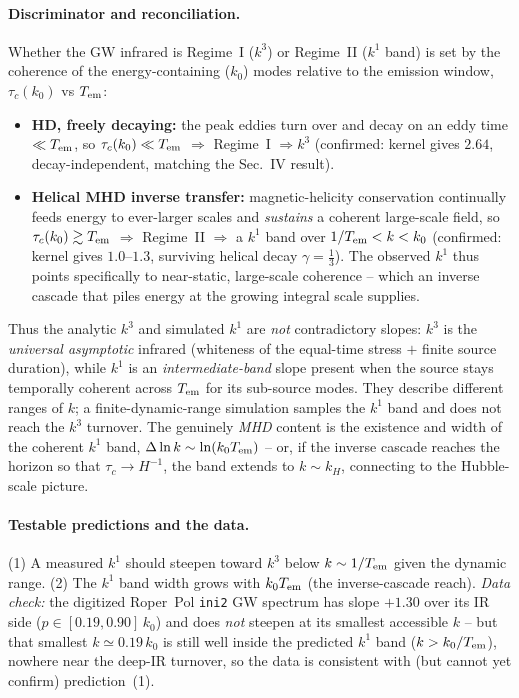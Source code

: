 \paragraph{Discriminator and reconciliation.}
Whether the GW infrared is Regime~I ($k^3$) or Regime~II ($k^1$ band) is set by the coherence of
the energy-containing ($k_0$) modes relative to the emission window, $\tau_c(k_0)$ vs $T_{\rm em}$:
\begin{itemize}\itemsep2pt
\item \textbf{HD, freely decaying:} the peak eddies turn over and decay on an eddy time
  $\ll T_{\rm em}$, so $\tau_c(k_0)\ll T_{\rm em}$ $\Rightarrow$ Regime~I $\Rightarrow k^3$
  (confirmed: kernel gives $2.64$, decay-independent, matching the Sec.~IV result).
\item \textbf{Helical MHD inverse transfer:} magnetic-helicity conservation continually feeds
  energy to ever-larger scales and \emph{sustains} a coherent large-scale field, so
  $\tau_c(k_0)\gtrsim T_{\rm em}$ $\Rightarrow$ Regime~II $\Rightarrow$ a $k^1$ band over
  $1/T_{\rm em}<k<k_0$ (confirmed: kernel gives $1.0$--$1.3$, surviving helical decay
  $\gamma=\tfrac13$). The observed $k^1$ thus points specifically to near-static, large-scale
  coherence -- which an inverse cascade that piles energy at the growing integral scale supplies.
\end{itemize}
Thus the analytic $k^3$ and simulated $k^1$ are \emph{not} contradictory slopes: $k^3$ is the
\emph{universal asymptotic} infrared (whiteness of the equal-time stress $+$ finite source
duration), while $k^1$ is an \emph{intermediate-band} slope present when the source stays
temporally coherent across $T_{\rm em}$ for its sub-source modes. They describe different ranges
of $k$; a finite-dynamic-range simulation samples the $k^1$ band and does not reach the $k^3$
turnover. The genuinely \emph{MHD} content is the existence and width of the coherent $k^1$ band,
$\Delta\ln k\sim\ln(k_0 T_{\rm em})$ -- or, if the inverse cascade reaches the horizon so that
$\tau_c\to H^{-1}$, the band extends to $k\sim k_H$, connecting to the Hubble-scale picture.

\paragraph{Testable predictions and the data.}
(1) A measured $k^1$ should steepen toward $k^3$ below $k\sim1/T_{\rm em}$ given the dynamic range.
(2) The $k^1$ band width grows with $k_0 T_{\rm em}$ (the inverse-cascade reach). \emph{Data check:}
the digitized Roper~Pol \texttt{ini2} GW spectrum has slope $+1.30$ over its IR side
($p\in[0.19,0.90]\,k_0$) and does \emph{not} steepen at its smallest accessible $k$ -- but that
smallest $k\simeq0.19\,k_0$ is still well inside the predicted $k^1$ band ($k>k_0/T_{\rm em}$),
nowhere near the deep-IR turnover, so the data is consistent with (but cannot yet confirm)
prediction~(1).

